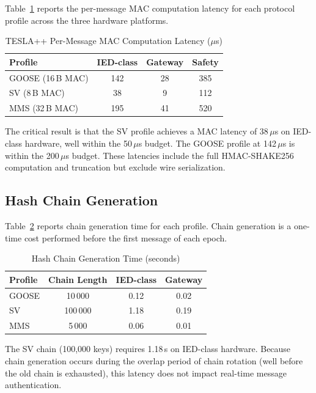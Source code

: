 \documentclass[conference,10pt]{IEEEtran}
\newcommand{\GOOSE}{\textsf{GOOSE}}
\newcommand{\SV}{\textsf{SV}}
\newcommand{\MMS}{\textsf{MMS}}
\begin{document}
Table~\ref{tab:mac_latency} reports the per-message MAC computation latency for each protocol profile across the three hardware platforms.

\begin{table}[t]
\centering
\caption{TESLA++ Per-Message MAC Computation Latency ($\mu$s)}
\label{tab:mac_latency}
\begin{tabular}{@{}lccc@{}}
\toprule
\textbf{Profile} & \textbf{IED-class} & \textbf{Gateway} & \textbf{Safety} \\
\midrule
\GOOSE{} (16\,B MAC)  & 142 & 28 & 385 \\
\SV{} (8\,B MAC)      & 38  & 9  & 112 \\
\MMS{} (32\,B MAC)    & 195 & 41 & 520 \\
\bottomrule
\end{tabular}
\end{table}

The critical result is that the \SV{} profile achieves a MAC latency of 38\,$\mu$s on IED-class hardware, well within the 50\,$\mu$s budget. The \GOOSE{} profile at 142\,$\mu$s is within the 200\,$\mu$s budget. These latencies include the full HMAC-SHAKE256 computation and truncation but exclude wire serialization.

\subsection{Hash Chain Generation}

Table~\ref{tab:chain_gen} reports chain generation time for each profile. Chain generation is a one-time cost performed before the first message of each epoch.

\begin{table}[t]
\centering
\caption{Hash Chain Generation Time (seconds)}
\label{tab:chain_gen}
\begin{tabular}{@{}lccc@{}}
\toprule
\textbf{Profile} & \textbf{Chain Length} & \textbf{IED-class} & \textbf{Gateway} \\
\midrule
\GOOSE{} & 10\,000   & 0.12 & 0.02 \\
\SV{}    & 100\,000  & 1.18 & 0.19 \\
\MMS{}   & 5\,000    & 0.06 & 0.01 \\
\bottomrule
\end{tabular}
\end{table}

The \SV{} chain (100{,}000 keys) requires 1.18\,s on IED-class hardware. Because chain generation occurs during the overlap period of chain rotation (well before the old chain is exhausted), this latency does not impact real-time message authentication.
\end{document}
